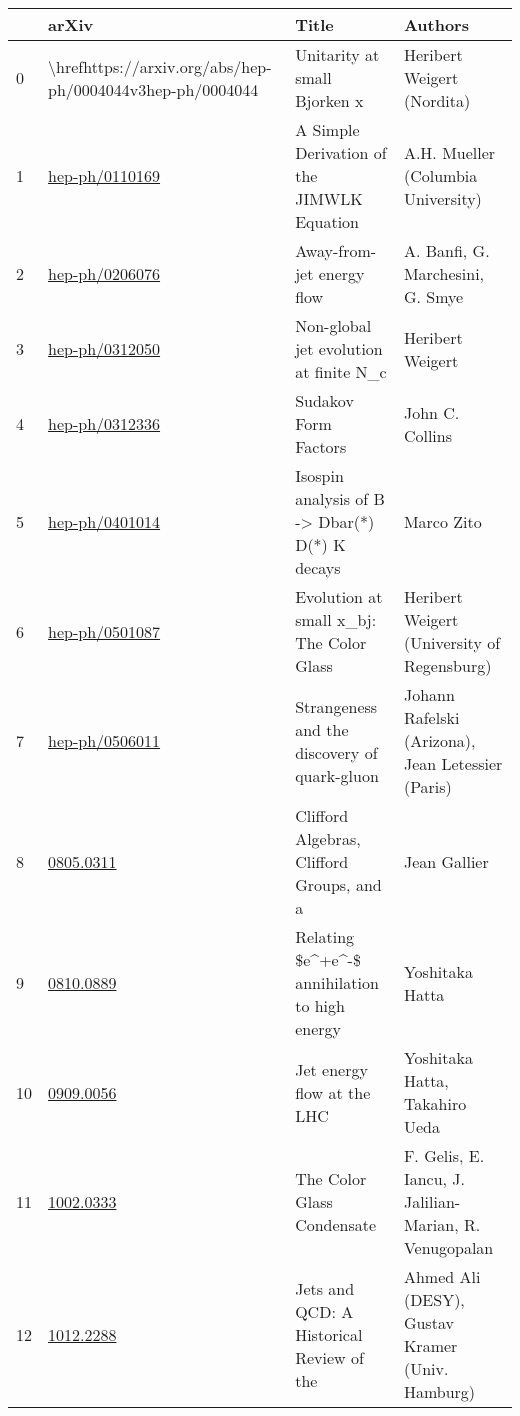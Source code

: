 \begin{tabular}{llll}
\toprule
{} &                                                          arXiv &                                            Title &                                                    Authors \\
\midrule
0  &  \textbackslash href{https://arxiv.org/abs/hep-ph/0004044v3}{hep-ph/0004044} &  Unitarity at small Bjorken x &  Heribert Weigert (Nordita) \\
1  &  \href{https://arxiv.org/abs/hep-ph/0110169v1}{hep-ph/0110169} &  A Simple Derivation of the JIMWLK Equation &  A.H. Mueller (Columbia University) \\
2  &  \href{https://arxiv.org/abs/hep-ph/0206076v2}{hep-ph/0206076} &  Away-from-jet energy flow &  A. Banfi, G. Marchesini, G. Smye \\
3  &  \href{https://arxiv.org/abs/hep-ph/0312050v1}{hep-ph/0312050} &  Non-global jet evolution at finite N\_c &  Heribert Weigert \\
4  &  \href{https://arxiv.org/abs/hep-ph/0312336v1}{hep-ph/0312336} &  Sudakov Form Factors &  John C. Collins \\
5  &  \href{https://arxiv.org/abs/hep-ph/0401014v3}{hep-ph/0401014} &  Isospin analysis of B -> Dbar(*) D(*) K decays &  Marco Zito \\
6  &  \href{https://arxiv.org/abs/hep-ph/0501087v1}{hep-ph/0501087} &  Evolution at small x\_bj: The Color Glass &  Heribert Weigert (University of Regensburg) \\
7  &  \href{https://arxiv.org/abs/hep-ph/0506011v1}{hep-ph/0506011} &  Strangeness and the discovery of quark-gluon &  Johann Rafelski (Arizona), Jean Letessier (Paris) \\
8  &  \href{https://arxiv.org/abs/0805.0311v3}{0805.0311} &  Clifford Algebras, Clifford Groups, and a &  Jean Gallier \\
9  &  \href{https://arxiv.org/abs/0810.0889v2}{0810.0889} &  Relating \$e\textasciicircum +e\textasciicircum -\$ annihilation to high energy &  Yoshitaka Hatta \\
10 &  \href{https://arxiv.org/abs/0909.0056v2}{0909.0056} &  Jet energy flow at the LHC &  Yoshitaka Hatta, Takahiro Ueda \\
11 &  \href{https://arxiv.org/abs/1002.0333v1}{1002.0333} &  The Color Glass Condensate &  F. Gelis, E. Iancu, J. Jalilian-Marian, R. Venugopalan \\
12 &  \href{https://arxiv.org/abs/1012.2288v2}{1012.2288} &  Jets and QCD: A Historical Review of the &  Ahmed Ali (DESY), Gustav Kramer (Univ. Hamburg) \\

\end{tabular}
